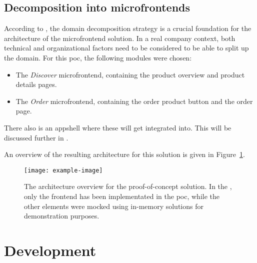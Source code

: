 \subsection{Decomposition into microfrontends}

According to \textcite{Rappl_2021}, the domain decomposition strategy is a
crucial foundation for the architecture of the \gls{microfrontend} solution. In
a real company context, both technical and organizational factors need to be
considered to be able to split up the domain. For this \gls{poc}, the following
modules were chosen:

\begin{itemize}
  \item The \textit{Discover} \gls{microfrontend}, containing the product
  overview and product details pages.
  \item The \textit{Order} \gls{microfrontend}, containing the order product
  button and the order page.
\end{itemize}

There also is an \gls{appshell} where these  will get
integrated into. This will be discussed further in .

An overview of the resulting architecture for this solution is given in
Figure~\ref{fig:poc-diagram}.

\begin{figure}
  \centering
  \texttt{[image: example-image]}  %
  \caption[Architecture overview for proof-of-concept solution]{The architecture
  overview for the proof-of-concept solution. In the ,
  only the \gls{frontend} has been implementated in the \gls{poc}, while the
  other elements were mocked using in-memory solutions for demonstration
  purposes.
  }
  \label{fig:poc-diagram}
\end{figure}

\section{Development}
\label{sec:poc-development}

